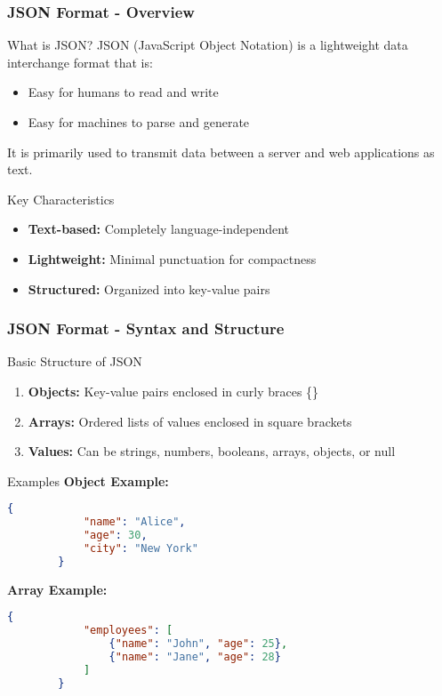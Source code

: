\documentclass[aspectratio=169]{beamer}
\begin{document}
\begin{frame}[fragile]
    \frametitle{JSON Format - Overview}
    \begin{block}{What is JSON?}
        JSON (JavaScript Object Notation) is a lightweight data interchange format that is:
        \begin{itemize}
            \item Easy for humans to read and write
            \item Easy for machines to parse and generate
        \end{itemize}
        It is primarily used to transmit data between a server and web applications as text.
    \end{block}
    
    \begin{block}{Key Characteristics}
        \begin{itemize}
            \item \textbf{Text-based:} Completely language-independent
            \item \textbf{Lightweight:} Minimal punctuation for compactness
            \item \textbf{Structured:} Organized into key-value pairs
        \end{itemize}
    \end{block}
\end{frame}

\begin{frame}[fragile]
    \frametitle{JSON Format - Syntax and Structure}
    \begin{block}{Basic Structure of JSON}
        \begin{enumerate}
            \item \textbf{Objects:} Key-value pairs enclosed in curly braces \{\}
            \item \textbf{Arrays:} Ordered lists of values enclosed in square brackets \[\]
            \item \textbf{Values:} Can be strings, numbers, booleans, arrays, objects, or null
        \end{enumerate}
    \end{block}

    \begin{block}{Examples}
        \textbf{Object Example:}
        \begin{lstlisting}[language=json]
        {
            "name": "Alice",
            "age": 30,
            "city": "New York"
        }
        \end{lstlisting}

        \textbf{Array Example:}
        \begin{lstlisting}[language=json]
        {
            "employees": [
                {"name": "John", "age": 25},
                {"name": "Jane", "age": 28}
            ]
        }
        \end{lstlisting}
    \end{block}
\end{frame}
\end{document}
